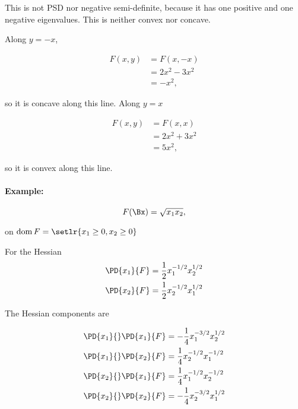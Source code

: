 This is not PSD nor negative semi-definite, because it has one positive and one negative eigenvalues.  This is neither convex nor concave.

Along \( y = -x \),

\begin{dmath}\label{eqn:convexOptimizationLecture7:240}
\begin{aligned}
F(x,y)
&=
F(x,-x) \\
&=
2 x^2 - 3 x^2 \\
&=
- x^2,
\end{aligned}
\end{dmath}

so it is concave along this line.  Along \( y = x \)

\begin{dmath}\label{eqn:convexOptimizationLecture7:260}
\begin{aligned}
F(x,y)
&=
F(x,x) \\
&=
2 x^2 + 3 x^2 \\
&=
5 x^2,
\end{aligned}
\end{dmath}

so it is convex along this line.

\paragraph{Example:}

\begin{dmath}\label{eqn:convexOptimizationLecture7:280}
F(\Bx) = \sqrt{ x_1 x_2 },
\end{dmath}

on \( \dom F = \setlr{ x_1 \ge 0, x_2 \ge 0 } \)

For the Hessian
\begin{dmath}\label{eqn:convexOptimizationLecture7:300}
\begin{aligned}
\PD{x_1}{F} &= \frac{1}{2} x_1^{-1/2} x_2^{1/2} \\
\PD{x_2}{F} &= \frac{1}{2} x_2^{-1/2} x_1^{1/2}
\end{aligned}
\end{dmath}

The Hessian components are

\begin{dmath}\label{eqn:convexOptimizationLecture7:320}
\begin{aligned}
\PD{x_1}{} \PD{x_1}{F} &= -\frac{1}{4} x_1^{-3/2} x_2^{1/2} \\
\PD{x_1}{} \PD{x_2}{F} &= \frac{1}{4} x_2^{-1/2} x_1^{-1/2} \\
\PD{x_2}{} \PD{x_1}{F} &= \frac{1}{4} x_1^{-1/2} x_2^{-1/2} \\
\PD{x_2}{} \PD{x_2}{F} &= -\frac{1}{4} x_2^{-3/2} x_1^{1/2}
\end{aligned}
\end{dmath}

